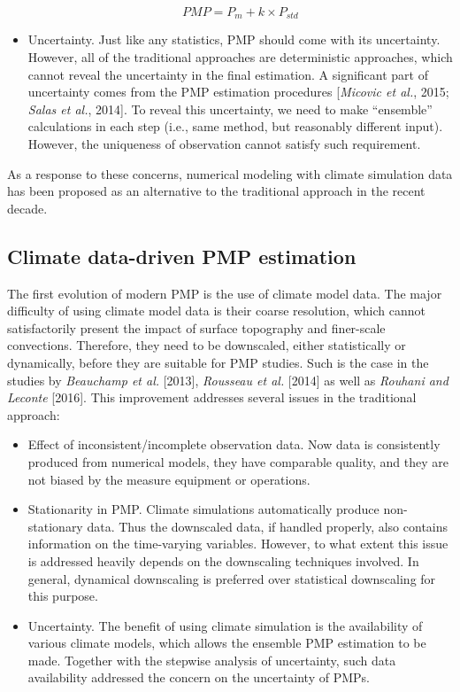 \begin{itemize}
\begin{equation}
	PMP = P_{m} + k \times P_{std}
	\label{eq:1-2}
\end{equation}

\item Uncertainty. Just like any statistics, PMP should come with its uncertainty. However, all of the traditional approaches are deterministic approaches, which cannot reveal the uncertainty in the final estimation. A significant part of uncertainty comes from the PMP estimation procedures [\textit{Micovic et al.}, 2015; \textit{Salas et al.}, 2014]. To reveal this uncertainty, we need to make ``ensemble'' calculations in each step (i.e., same method, but reasonably different input). However, the uniqueness of observation cannot satisfy such requirement.
\end{itemize}

As a response to these concerns, numerical modeling with climate simulation data has been proposed as an alternative to the traditional approach in the recent decade.

\subsection{Climate data-driven PMP estimation}

The first evolution of modern PMP is the use of climate model data. The major difficulty of using climate model data is their coarse resolution, which cannot satisfactorily present the impact of surface topography and finer-scale convections. Therefore, they need to be downscaled, either statistically or dynamically, before they are suitable for PMP studies. Such is the case in the studies by \textit{Beauchamp et al.} [2013], \textit{Rousseau et al.} [2014] as well as \textit{Rouhani and Leconte} [2016]. This improvement addresses several issues in the traditional approach:

\begin{itemize}
\item Effect of inconsistent/incomplete observation data. Now data is consistently produced from numerical models, they have comparable quality, and they are not biased by the measure equipment or operations.

\item Stationarity in PMP. Climate simulations automatically produce non-stationary data. Thus the downscaled data, if handled properly, also contains information on the time-varying variables. However, to what extent this issue is addressed heavily depends on the downscaling techniques involved. In general, dynamical downscaling is preferred over statistical downscaling for this purpose.

\item Uncertainty. The benefit of using climate simulation is the availability of various climate models, which allows the ensemble PMP estimation to be made. Together with the stepwise analysis of uncertainty, such data availability addressed the concern on the uncertainty of PMPs.
\end{itemize}

